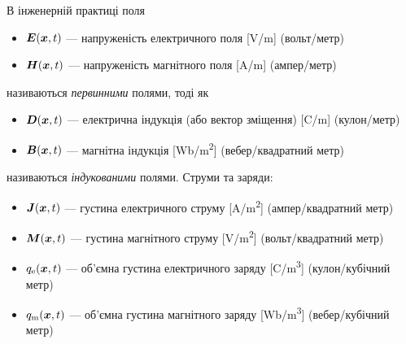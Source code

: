 %
%
В інженерній практиці поля
\begin{itemize}
	\item \( \bm{E}(\bm{x}, t) \) — напруженість електричного поля [\si{V/m}] (вольт/метр)
	\item \( \bm{H}(\bm{x}, t) \) — напруженість магнітного поля [\si{A/m}] (ампер/метр)
\end{itemize}
називаються \emph{первинними} полями, тоді як
\begin{itemize}
	\item \( \bm{D}(\bm{x}, t) \) — електрична індукція (або вектор зміщення) [\si{C/m}] (кулон/метр)
	\item \( \bm{B}(\bm{x}, t) \) — магнітна індукція [\si{Wb/m^2}] (вебер/квадратний метр)
\end{itemize}
називаються \emph{індукованими} полями. Струми та заряди:
\begin{itemize}
	\item \( \bm{J}(\bm{x}, t) \) — густина електричного струму [\si{A/m^2}] (ампер/квадратний метр)
	\item \( \bm{M}(\bm{x}, t) \) — густина магнітного струму [\si{V/m^2}] (вольт/квадратний метр)
	\item \( q_{\mathrm{e}}(\bm{x}, t) \) — об'ємна густина електричного заряду [\si{C/m^3}] (кулон/кубічний метр)
	\item \( q_{\mathrm{m}}(\bm{x}, t) \) — об'ємна густина магнітного заряду [\si{Wb/m^3}] (вебер/кубічний метр)
\end{itemize}
